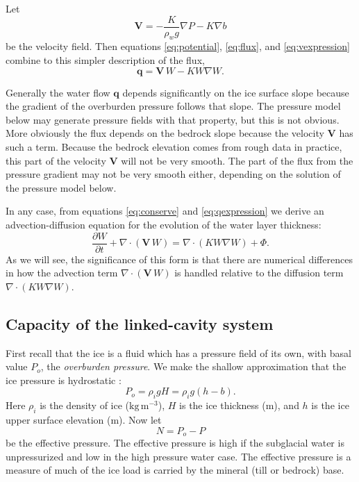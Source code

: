 \documentclass[12pt,final]{amsart}%
\newcommand\bV{\mathbf{V}}
\newcommand\bq{\mathbf{q}}
\newcommand{\Div}{\nabla\cdot}
\newcommand{\grad}{\nabla}
\begin{document}
Let
\begin{equation} \label{eq:vexpression}
  \bV = - \frac{K}{\rho_w g} \grad P - K \grad b
\end{equation}
be the velocity field.  Then equations \eqref{eq:potential}, \eqref{eq:flux}, and \eqref{eq:vexpression} combine to this simpler description of the flux,
\begin{equation} \label{eq:qexpression}
  \bq = \bV\, W - K W \grad W.
\end{equation}

Generally the water flow $\bq$ depends significantly on the ice surface slope because the gradient of the overburden pressure follows that slope.  The pressure model below may generate pressure fields with that property, but this is not obvious.  More obviously the flux depends on the bedrock slope because the velocity $\bV$ has such a term.  Because the bedrock elevation comes from rough data in practice, this part of the velocity $\bV$ will not be very smooth.  The part of the flux from the pressure gradient may not be very smooth either, depending on the solution of the pressure model below.

In any case, from equations \eqref{eq:conserve} and \eqref{eq:qexpression} we derive an advection-diffusion equation \citep{HundsdorferVerwer2010,MortonMayers} for the evolution of the water layer thickness:
\begin{equation} \label{eq:adeqn}
  \frac{\partial W}{\partial t} + \Div\left(\bV\, W\right) = \Div \left(K W \grad W\right) + \Phi.
\end{equation}
As we will see, the significance of this form is that there are numerical differences in how the advection term $\Div\left(\bV\, W\right)$ is handled relative to the diffusion term $\Div \left(K W \grad W\right)$.

\subsection*{Capacity of the linked-cavity system}  First recall that the ice is a fluid which has a pressure field of its own, with basal value $P_o$, the \emph{overburden pressure}.  We make the shallow approximation that the ice pressure is hydrostatic \citep{GreveBlatter2009}:
\begin{equation} \label{eq:hydrostatic}
  P_o = \rho_i g H = \rho_i g (h-b).
\end{equation}
Here $\rho_i$ is the density of ice ($\text{kg}\,\text{m}^{-3}$), $H$ is the ice thickness (m), and $h$ is the ice upper surface elevation (m).  Now let
\begin{equation}
N = P_o - P\label{eq:effective}
\end{equation}
be the effective pressure.  The effective pressure is high if the subglacial water is unpressurized and low in the high pressure water case.  The effective pressure is a measure of much of the ice load is carried by the mineral (till or bedrock) base.
\end{document}
